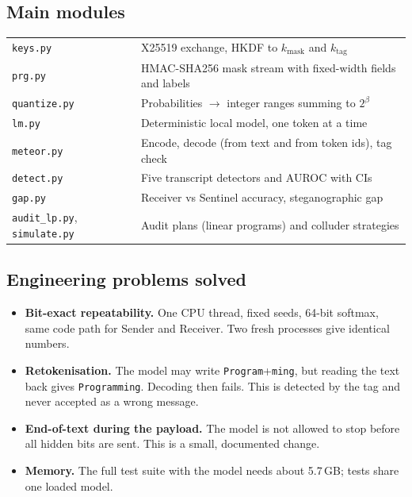 \documentclass[11pt,a4paper]{article}
\begin{document}
\subsection{Main modules}
\begin{tabularx}{\linewidth}{lX}
\toprule
\texttt{keys.py} & X25519 exchange, HKDF to $k_\text{mask}$ and $k_\text{tag}$\\
\texttt{prg.py} & HMAC-SHA256 mask stream with fixed-width fields and labels\\
\texttt{quantize.py} & Probabilities $\to$ integer ranges summing to $2^\beta$\\
\texttt{lm.py} & Deterministic local model, one token at a time\\
\texttt{meteor.py} & Encode, decode (from text and from token ids), tag check\\
\texttt{detect.py} & Five transcript detectors and AUROC with CIs\\
\texttt{gap.py} & Receiver vs Sentinel accuracy, steganographic gap\\
\texttt{audit\_lp.py}, \texttt{simulate.py} & Audit plans (linear programs) and colluder strategies\\
\bottomrule
\end{tabularx}

\subsection{Engineering problems solved}
\begin{itemize}
  \item \textbf{Bit-exact repeatability.} One CPU thread, fixed seeds, 64-bit softmax, same code path for Sender and Receiver. Two fresh processes give identical numbers.
  \item \textbf{Retokenisation.} The model may write \texttt{Program}+\texttt{ming}, but reading the text back gives \texttt{Programming}. Decoding then fails. This is detected by the tag and never accepted as a wrong message.
  \item \textbf{End-of-text during the payload.} The model is not allowed to stop before all hidden bits are sent. This is a small, documented change.
  \item \textbf{Memory.} The full test suite with the model needs about 5.7\,GB; tests share one loaded model.
\end{itemize}
\end{document}
